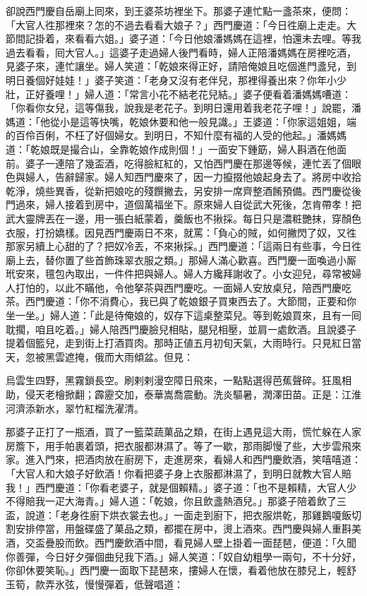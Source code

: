 卻說西門慶自岳廟上囘來，到王婆茶坊裡坐下。那婆子連忙點一盞茶來，便問：「大官人徃那裡來？怎的不過去看看大娘子？」西門慶道：「今日徃廟上走走。大節間記掛着，來看看六姐。」婆子道：「今日他娘潘媽媽在這裡，怕還未去哩。等我過去看看，囘大官人。」這婆子走過婦人後門看時，婦人正陪潘媽媽在房裡吃酒，見婆子來，連忙讓坐。婦人笑道：「乾娘來得正好，請陪俺娘且吃個進門盞兒，到明日養個好娃娃！」婆子笑道：「老身又沒有老伴兒，那裡得養出來？你年小少壯，正好養哩！」婦人道：「常言小花不結老花兒結。」婆子便看着潘媽媽嘈道：「你看你女兒，這等傷我，說我是老花子。到明日還用着我老花子哩！」{}說罷，潘媽道：「他從小是這等快嘴，乾娘休要和他一般見識。」王婆道：「你家這姐姐，端的百伶百俐，不枉了好個婦女。到明日，不知什麼有福的人受的他起。」潘媽媽道：「乾娘既是撮合山，全靠乾娘作成則個！」一面安下鍾筯，婦人斟酒在他面前。婆子一連陪了幾盃酒，吃得臉紅紅的，又怕西門慶在那邊等候，連忙丟了個眼色與婦人，告辭歸家。婦人知西門慶來了，因一力攛掇他娘起身去了。將房中收拾乾淨，燒些異香，從新把娘吃的殘饌撇去，另安排一席齊整酒餚預備。西門慶從後門過來，婦人接着到房中，道個萬福坐下。原來婦人自從武大死後，怎肯帶孝！把武大靈牌丟在一邊，{}用一張白紙蒙着，羹飯也不揪採。每日只是濃粧艷抹，穿顏色衣服，打扮嬌樣。因見西門慶兩日不來，就罵：「負心的賊，如何撇閃了奴，又徃那家另續上心甜的了？把奴冷丟，不來揪採。」西門慶道：「這兩日有些事，今日徃廟上去，替你置了些首飾珠翠衣服之類。」那婦人滿心歡喜。西門慶一面喚過小厮玳安來，氊包內取出，一件件把與婦人。婦人方纔拜謝收了。小女迎兒，尋常被婦人打怕的，以此不瞞他，令他拏茶與西門慶吃。一面婦人安放桌兒，陪西門慶吃茶。西門慶道：「你不消費心，我已與了乾娘銀子買東西去了。大節間，正要和你坐一坐。」婦人道：「此是待俺娘的，奴存下這桌整菜兒。等到乾娘買來，且有一囘耽擱，咱且吃着。」婦人陪西門慶臉兒相貼，腿兒相壓，並肩一處飲酒。且說婆子提着個籃兒，走到街上打酒買肉。那時正値五月初旬天氣，大雨時行。只見紅日當天，忽被黑雲遮掩，俄而大雨傾盆。但見：

\begin{myquote} 
烏雲生四野，黑霧鎖長空。刷剌剌漫空障日飛來，一點點選得芭蕉聲碎。狂風相助，侵天老檜掀翻；霹靂交加，泰華嵩喬震動。洗炎驅暑，潤澤田苗。正是：江淮河濟添新水，翠竹紅榴洗濯清。
\end{myquote} 

那婆子正打了一瓶酒，買了一籃菜蔬菓品之類，在街上遇見這大雨，慌忙躲在人家房簷下，用手帕裹着頭，把衣服都淋濕了。等了一歇，那雨脚慢了些，大步雲飛來家。進入門來，把酒肉放在廚房下，走進房來，看婦人和西門慶飲酒，笑嘻嘻道：「大官人和大娘子好飲酒！你看把婆子身上衣服都淋濕了，到明日就教大官人賠我！」西門慶道：「你看老婆子，就是個賴精。」婆子道：「也不是賴精，大官人少不得賠我一疋大海青。」婦人道：「乾娘，你且飲盞熱酒兒。」那婆子陪着飲了三盃，說道：「老身徃廚下烘衣裳去也。」一面走到廚下，把衣服烘乾，那雞鵝嗄飯切割安排停當，用盤碟盛了菓品之類，都擺在房中，燙上酒來。西門慶與婦人重斟美酒，交盃疊股而飲。西門慶飲酒中間，看見婦人壁上掛着一面琵琶，便道：「久聞你善彈，今日好夕彈個曲兒我下酒。」婦人笑道：「奴自幼粗學一兩句，不十分好，你卻休要笑恥。」西門慶一面取下琵琶來，摟婦人在懷，看着他放在膝兒上，輕舒玉筍，款弄氷弦，慢慢彈着，低聲唱道：

